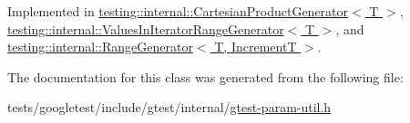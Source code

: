 Implemented in \hyperlink{classtesting_1_1internal_1_1CartesianProductGenerator_ae072dcf8400ac9dd5692e417262a664b}{testing\+::internal\+::\+Cartesian\+Product\+Generator$<$ T $>$}, \hyperlink{classtesting_1_1internal_1_1ValuesInIteratorRangeGenerator_a298cfb66a90b1a39c0cea3ca7ae1ece1}{testing\+::internal\+::\+Values\+In\+Iterator\+Range\+Generator$<$ T $>$}, and \hyperlink{classtesting_1_1internal_1_1RangeGenerator_ac112ca69567b9c47bf14554e0473e1e2}{testing\+::internal\+::\+Range\+Generator$<$ T, Increment\+T $>$}.



The documentation for this class was generated from the following file\+:\begin{DoxyCompactItemize}
\item 
tests/googletest/include/gtest/internal/\hyperlink{gtest-param-util_8h}{gtest-\/param-\/util.\+h}\end{DoxyCompactItemize}
